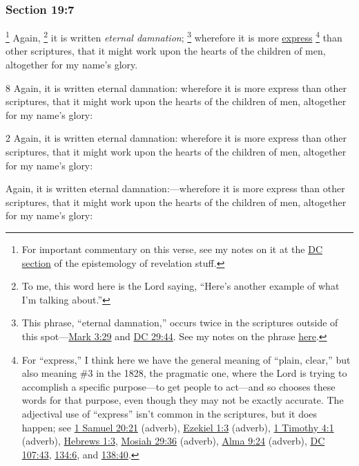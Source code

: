 	\subsubsection{Section 19:7} %
		\label{DC19-7}

			\footnote{%
				For important commentary on this verse, see my notes on it at the \hyperref[EPIST-REVELATION-DC]{DC section} of the epistemology of revelation stuff.
				}%
		Again,%
			\footnote{%
				To me, this word here is the Lord saying, ``Here's another example of what I'm talking about.'' 
				}
		it is written \textit{eternal damnation};%
			\footnote{%
				This phrase, ``eternal damnation,'' occurs twice in the scriptures outside of this spot---\hyperref[MARK-3-29]{Mark 3:29} and \hyperref[DC29-44]{DC 29:44}. See my notes on the phrase \hyperref[ETERNITY-PHRASES]{here}.
				}
		wherefore it is more \hyperref[EXPRESS]{express}%
			\footnote{%
				For ``express,'' I think here we have the general meaning of ``plain, clear,'' but also meaning \#3 in the 1828, the pragmatic one, where the Lord is trying to accomplish a specific purpose---to get people to act---and so chooses these words for that purpose, even though they may not be exactly accurate.
				The adjectival use of ``express'' isn't common in the scriptures, but it does happen; see \hyperref[1SAMUEL-20-21]{1 Samuel 20:21} (adverb), \hyperref[EZEKIEL-1-3]{Ezekiel 1:3} (adverb), \hyperref[1TIMOTHY-4-1]{1 Timothy 4:1} (adverb), \hyperref[HEBREWS-1-3]{Hebrews 1:3}, \hyperref[MOSIAH-29-36]{Mosiah 29:36} (adverb), \hyperref[ALMA-9-24]{Alma 9:24} (adverb), \hyperref[DC107-43]{DC 107:43}, \hyperref[DC134-6]{134:6}, and \hyperref[DC138-40]{138:40}.
				}
		than other scriptures, that it might work upon the hearts of the children of men, altogether for my name's glory.

		\begin{framed}
		\scriptsize
			\begin{compactdesc}
				\item[JSP] 8 Again, it is written eternal damnation: wherefore it is more express than other scriptures, that it might work upon the hearts of the children of men, altogether for my name's glory:
				\item[RB1] [\textit{missing}]
				\item[DC 1835] 2 Again, it is written eternal damnation: wherefore it is more express than other scriptures, that it might work upon the hearts of the children of men, altogether for my name's glory: 
				\item[DC 1844] Again, it is written eternal damnation:---wherefore it is more express than other scriptures, that it might work upon the hearts of the children of men, altogether for my name's glory: 
			\end{compactdesc}
		\end{framed}

